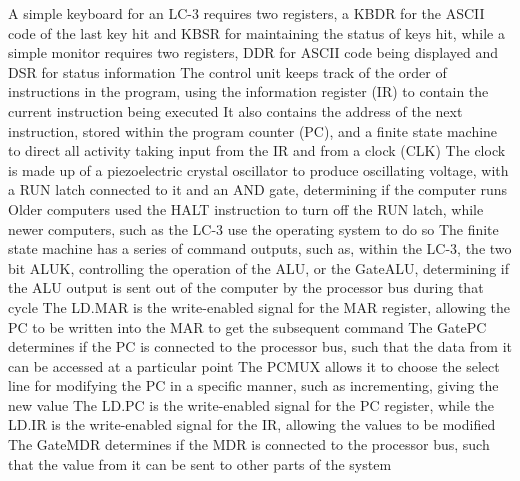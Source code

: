 \documentclass[11 pt, twoside]{article}
\newenvironment{outline*}
{
	\begin{outline}[enumerate]
	}
	{\end{outline}
}
\begin{document}
\begin{outline*}
\2 A simple keyboard for an LC-3 requires two registers, a KBDR for the ASCII code of the last key hit and KBSR for maintaining the status of keys hit, while a simple monitor requires two registers,  DDR for ASCII code being displayed and DSR for status information
\1 The control unit keeps track of the order of instructions in the program, using the information register (IR) to contain the current instruction being executed
\2 It also contains the address of the next instruction, stored within the program counter (PC), and a finite state machine to direct all activity taking input from the IR and from a clock (CLK)
\3 The clock is made up of a piezoelectric crystal oscillator to produce oscillating voltage, with a RUN latch connected to it and an AND gate, determining if the computer runs
\3 Older computers used the HALT instruction to turn off the RUN latch, while newer computers, such as the LC-3 use the operating system to do so
\2 The finite state machine has a series of command outputs, such as, within the LC-3, the two bit ALUK, controlling the operation of the ALU, or the GateALU, determining if the ALU output is sent out of the computer by the processor bus during that cycle
\3 The LD.MAR is the write-enabled signal for the MAR register, allowing the PC to be written into the MAR to get the subsequent command
\3 The GatePC determines if the PC is connected to the processor bus, such that the data from it can be accessed at a particular point
\3 The PCMUX allows it to choose the select line for modifying the PC in a specific manner, such as incrementing, giving the new value
\3 The LD.PC is the write-enabled signal for the PC register, while the LD.IR is the write-enabled signal for the IR, allowing the values to be modified
\3 The GateMDR determines if the MDR is connected to the processor bus, such that the value from it can be sent to other parts of the system
\end{outline*}
\end{document}

